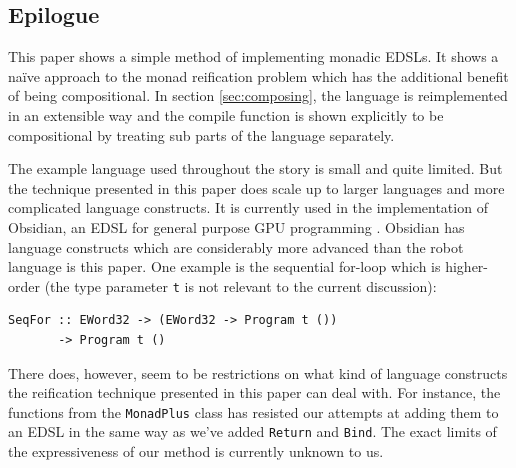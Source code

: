 


\subsection{Epilogue} 


This paper shows a simple method of implementing monadic EDSLs. It shows a
na\"ive approach to the monad reification problem which has the additional benefit of being compositional. In section 
\ref{sec:composing}, the language is reimplemented in an extensible way and 
the compile function is shown explicitly to be compositional by treating sub 
parts of the language separately.  

The example language used throughout the story is small and quite
limited. But the technique presented in this paper does scale up to
larger languages and more complicated language constructs.  It is
currently used in the implementation of Obsidian, an EDSL for general
purpose GPU programming \cite{Obsidian-Expressive}. Obsidian has language
constructs which are considerably more advanced than the robot
language is this paper. One example is the sequential for-loop which
is higher-order (the type parameter {\tt t} is not relevant to the
current discussion):
\begin{small}
\begin{verbatim}
SeqFor :: EWord32 -> (EWord32 -> Program t ())
       -> Program t ()
\end{verbatim}
\end{small}
There does, however, seem to be restrictions on what kind of language
constructs the reification technique presented in this paper can deal
with. For instance, the functions from the {\tt MonadPlus} class has
resisted our attempts at adding them to an EDSL in the same way as
we've added {\tt Return} and {\tt Bind}. The exact limits of the
expressiveness of our method is currently unknown to us.


